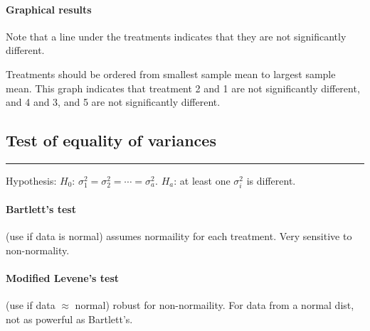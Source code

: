 \documentclass[10pt]{article}
\begin{document}
\paragraph{Graphical results} Note that a line under the treatments indicates that they are not significantly different. \\
\begin{multicols}{2}


  
  \noindent Treatments should be ordered from smallest sample mean to largest sample mean. This graph indicates that treatment 2 and 1 are not significantly different, and 4 and 3, and 5 are not significantly different.
\end{multicols}

\subsection*{Test of equality of variances}
\hrule width 6cm
\vspace{6pt}
Hypothesis: $H_0$: $\sigma_1^2 = \sigma_2^2 = \cdots = \sigma_a^2$. $H_a$: at least one $\sigma_i^2$ is different.
\paragraph{Bartlett's test} (use if data is normal) assumes normaility for each treatment. Very sensitive to non-normality.
\paragraph{Modified Levene's test} (use if data $\approx$ normal) robust for non-normaility. For data from a normal dist, not as powerful as Bartlett's.
\end{document}
